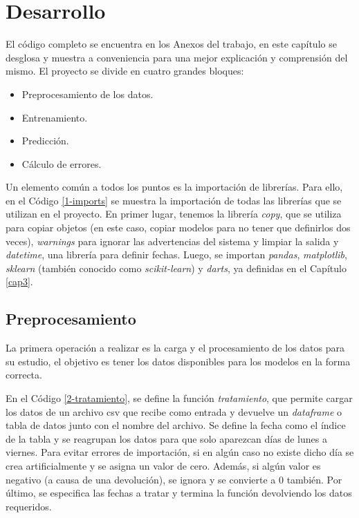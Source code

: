 \chapter{Desarrollo}\label{cap4}

El código completo se encuentra en los Anexos del trabajo, en este capítulo se desglosa y muestra a conveniencia para una mejor explicación y comprensión del mismo. El proyecto se divide en cuatro grandes bloques:

\begin{itemize}
    \item Preprocesamiento de los datos.
    \item Entrenamiento.
    \item Predicción.
    \item Cálculo de errores.
\end{itemize}

Un elemento común a todos los puntos es la importación de librerías. Para ello, en el Código \ref*{1-imports} se muestra la importación de todas las librerías que se utilizan en el proyecto. En primer lugar, tenemos la librería \textit{copy}, que se utiliza para copiar objetos (en este caso, copiar modelos para no tener que definirlos dos veces), \textit{warnings} para ignorar las advertencias del sistema y limpiar la salida y \textit{datetime}, una librería para definir fechas. Luego, se importan \textit{pandas}, \textit{matplotlib}, \textit{sklearn} (también conocido como \textit{scikit-learn}) y \textit{darts}, ya definidas en el Capítulo \ref{cap3}.



\section{Preprocesamiento}\label{cap4-preproc}

La primera operación a realizar es la carga y el procesamiento de los datos para su estudio, el objetivo es tener los datos disponibles para los modelos en la forma correcta.

En el Código \ref*{2-tratamiento}, se define la función \textit{tratamiento}, que permite cargar los datos de un archivo csv que recibe como entrada y devuelve un \textit{dataframe} o tabla de datos junto con el nombre del archivo. Se define la fecha como el índice de la tabla y se reagrupan los datos para que solo aparezcan días de lunes a viernes. Para evitar errores de importación, si en algún caso no existe dicho día se crea artificialmente y se asigna un valor de cero. Además, si algún valor es negativo (a causa de una devolución), se ignora y se convierte a 0 también. Por último, se especifica las fechas a tratar y termina la función devolviendo los datos requeridos.

